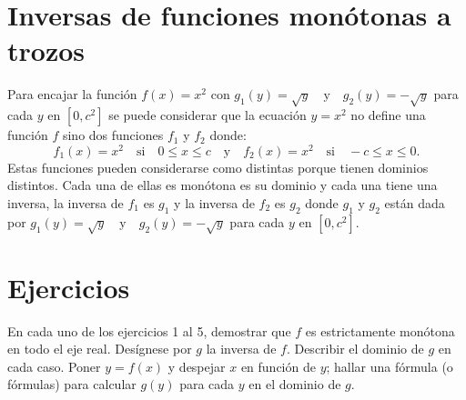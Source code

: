 \section{Inversas de funciones monótonas a trozos}
Para encajar la función $f(x)=x^2$ con $g_1(y)=\sqrt{y}\quad \mbox{y}\quad g_2(y)=-\sqrt{y}$ para cada $y$ en $[0,c^2]$ se puede considerar que la ecuación $y=x^2$ no define una función $f$ sino dos funciones $f_1$ y $f_2$ donde:
$$f_1(x)=x^2 \quad \mbox{si}\quad 0\leq x \leq c \quad \mbox{y}\quad f_2(x)=x^2\quad \mbox{si}\quad -c\leq x \leq 0.$$
Estas funciones pueden considerarse como distintas porque tienen dominios distintos. Cada una de ellas es monótona es su dominio y cada una tiene una inversa, la inversa de $f_1$ es $g_1$ y la inversa de $f_2$ es $g_2$ donde $g_1$ y $g_2$ están dada por $g_1(y)=\sqrt{y}\quad \mbox{y}\quad g_2(y)=-\sqrt{y}$ para cada $y$ en $[0,c^2]$.


\section{Ejercicios}

En cada uno de los ejercicios 1 al 5, demostrar que $f$ es estrictamente monótona en todo el eje real. Desígnese por $g$ la inversa de $f$. Describir el dominio de $g$ en cada caso. Poner $y=f(x)$ y despejar $x$ en función de $y$; hallar una fórmula (o fórmulas) para calcular $g(y)$ para cada $y$ en el dominio de $g$.\\

